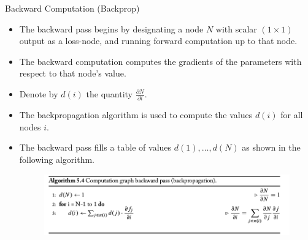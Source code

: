 \documentclass[handout]{beamer}
\begin{document}
\begin{frame}{Backward Computation (Backprop)}
\begin{scriptsize}
\begin{itemize}

\item The backward pass begins by designating a node $N$ with scalar $(1\times1)$ output as a loss-node, and running forward computation up to that node.

\item The backward computation computes the gradients of the parameters with respect to that node's value.


\item Denote by $d(i)$  the quantity $\frac{\partial N}{ \partial i}$.

\item The backpropagation algorithm is used to compute the values $d(i)$  for all nodes $i$.

\item The backward pass fills a table of values $d(1), \dots, d(N)$  as shown in the following algorithm.

 \begin{figure}[htb]
	\centering
	 \includegraphics[scale=0.35]{pics/backwardPass.png}
\end{figure}

\end{itemize}
\end{scriptsize}
\end{frame}
\end{document}
